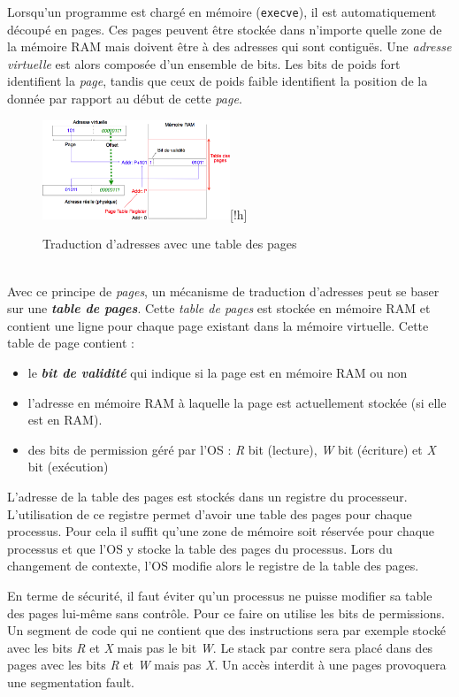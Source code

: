 Lorsqu'un programme est chargé en mémoire (\texttt{execve}), il est automatiquement découpé en pages. Ces pages peuvent être stockée dans n'importe quelle zone de la mémoire RAM mais doivent être à des adresses qui sont contiguës. Une \textit{adresse virtuelle} est alors composée d'un ensemble de bits. Les bits de poids fort identifient la \textit{page}, tandis que ceux de poids faible identifient la position de la donnée par rapport au début de cette \textit{page}.\\
\begin{figure}
  \centering
  \includegraphics[width=0.5\textwidth]{memtradadresses}[!h]
  \caption{Traduction d'adresses avec une table des pages}
\end{figure}\\
Avec ce principe de \textit{pages}, un mécanisme de traduction d'adresses peut se baser sur une \textit{\textbf{table de pages}}. Cette \textit{table de pages} est stockée en mémoire RAM et contient une ligne pour chaque page existant dans la mémoire virtuelle. Cette table de page contient :
\begin{itemize}
  \item le \textit{\textbf{bit de validité}} qui indique si la page est en mémoire RAM ou non
  \item l'adresse en mémoire RAM à laquelle la page est actuellement stockée (si elle est en RAM).
  \item des bits de permission géré par l'OS : \textit{R} bit (lecture), \textit{W} bit (écriture) et \textit{X} bit (exécution)
\end{itemize}

L'adresse de la table des pages est stockés dans un registre du processeur.
L'utilisation de ce registre permet d'avoir une table des pages pour chaque processus.
Pour cela il suffit qu'une zone de mémoire soit réservée pour chaque processus
et que l'OS y stocke la table des pages du processus.
Lors du changement de contexte, l'OS modifie alors le registre de la table des pages.

En terme de sécurité,
il faut éviter qu'un processus ne puisse modifier sa table des pages
lui-même sans contrôle. Pour ce faire on utilise les bits de permissions.
Un segment de code qui ne contient que des instructions sera par exemple
stocké avec les bits \textit{R} et \textit{X} mais pas le bit \textit{W}.
Le stack par contre sera placé dans des pages avec les bits \textit{R}
et \textit{W} mais pas \textit{X}.
Un accès interdit à une pages provoquera une segmentation fault.

